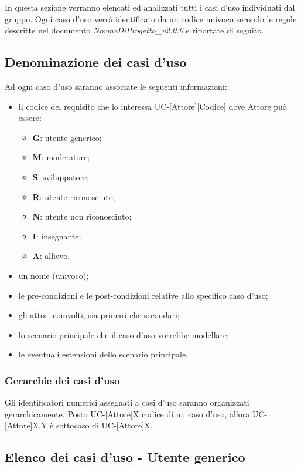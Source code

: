 In questa sezione verranno elencati ed analizzati tutti i casi d'uso individuati dal gruppo. Ogni caso d'uso verrà identificato da un codice univoco secondo le regole descritte nel documento \textit{NormeDiProgetto\_v2.0.0} e riportate di seguito. 

\subsection{Denominazione dei casi d'uso}
Ad ogni caso d'uso saranno associate le seguenti informazioni:
\begin{itemize}
\item il codice del requisito che lo interessa UC-[Attore][Codice] dove Attore può essere:
	\begin{itemize}
		\item \textbf{G}: utente generico;
		\item \textbf{M}: moderatore;
		\item \textbf{S}: sviluppatore;
		\item \textbf{R}: utente riconosciuto;
		\item \textbf{N}: utente non riconosciuto;
		\item \textbf{I}: insegnante;
		\item \textbf{A}: allievo.
	\end{itemize}
\item un nome (univoco);
\item le pre-condizioni e le post-condizioni relative allo specifico caso d'uso;
\item gli attori coinvolti, sia primari che secondari;
\item lo scenario principale che il caso d'uso vorrebbe modellare;
\item le eventuali estensioni dello scenario principale.
\end{itemize}

\subsubsection{Gerarchie dei casi d'uso} 
Gli identificatori numerici assegnati a casi d'uso saranno organizzati gerarchicamente. Posto UC-[Attore]X codice di un caso d'uso, allora UC-[Attore]X.Y è sottocaso di UC-[Attore]X.

\subsection{Elenco dei casi d'uso - Utente generico}

